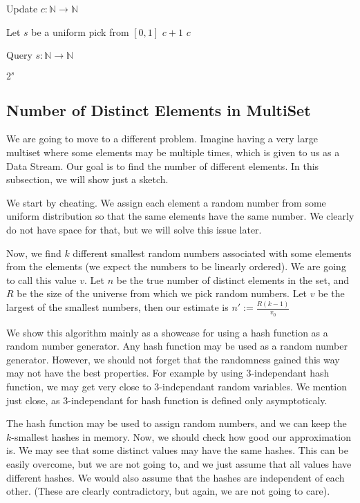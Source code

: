 \begin{algorithm}
\caption{Update $c : \mathbb{N} \to \mathbb{N}$}
\begin{algorithmic}[1]
\State Let $s$ be a uniform pick from $[0,1]$
    \State \Return $c + 1$
\Else
    \State \Return $c$
\EndIf
\end{algorithmic}
\end{algorithm}

\begin{algorithm}
\caption{Query $s : \mathbb{N} \to \mathbb{N}$}
\begin{algorithmic}[1]
\State \Return $2^s$
\end{algorithmic}
\end{algorithm}

\subsection{Number of Distinct Elements in MultiSet}
We are going to move to a different problem. Imagine having a very large multiset where some elements may be multiple times, which is given to us as a Data Stream. Our goal is to find the number of different elements. In this subsection, we will show just a sketch.

We start by cheating. We assign each element a random number from some uniform distribution so that the same elements have the same number. We clearly do not have space for that, but we will solve this issue later. 

Now, we find $k$ different smallest random numbers associated with some elements from the elements (we expect the numbers to be linearly ordered). We are going to call this value $v$. Let $n$ be the true number of distinct elements in the set, and $R$ be the size of the universe from which we pick random numbers. Let $v$ be the largest of the smallest numbers, 
then our estimate is $n' :=  \frac{R(k-1)}{v_0} $ 

We show this algorithm mainly as a showcase for using a hash function as a random number generator. Any hash function may be used as a random number generator. However, we should not forget that the randomness gained this way may not have the best properties. For example by using $3$-independant hash function, we may get very close to $3$-independant random variables. We mention just close, as  $3$-independant for hash function is defined only asymptoticaly. 

The hash function may be used to assign random numbers, and we can keep the $k$-smallest hashes in memory. Now, we should check how good our approximation is. We may see that some distinct values may have the same hashes. This can be easily overcome, but we are not going to, and we just assume that all values have different hashes. We would also assume that the hashes are independent of each other. (These are clearly contradictory, but again, we are not going to care). 


